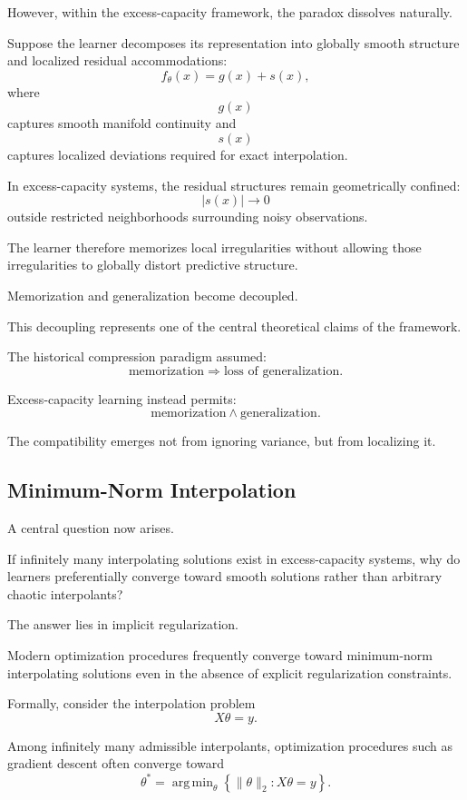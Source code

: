 \documentclass[12pt,a4paper]{article}
\DeclareMathOperator*{\argmin}{arg\,min}
\begin{document}
However, within the excess-capacity framework, the paradox dissolves naturally.

Suppose the learner decomposes its representation into globally smooth structure and localized residual accommodations:
\[
f_\theta(x)
=
g(x)
+
s(x),
\]
where
\[
g(x)
\]
captures smooth manifold continuity and
\[
s(x)
\]
captures localized deviations required for exact interpolation.

In excess-capacity systems, the residual structures remain geometrically confined:
\[
|s(x)| \to 0
\]
outside restricted neighborhoods surrounding noisy observations.

The learner therefore memorizes local irregularities without allowing those irregularities to globally distort predictive structure.

Memorization and generalization become decoupled.

This decoupling represents one of the central theoretical claims of the framework.

The historical compression paradigm assumed:
\[
\text{memorization}
\Rightarrow
\text{loss of generalization}.
\]

Excess-capacity learning instead permits:
\[
\text{memorization}
\land
\text{generalization}.
\]

The compatibility emerges not from ignoring variance, but from localizing it.

\subsection{Minimum-Norm Interpolation}

A central question now arises.

If infinitely many interpolating solutions exist in excess-capacity systems, why do learners preferentially converge toward smooth solutions rather than arbitrary chaotic interpolants?

The answer lies in implicit regularization.

Modern optimization procedures frequently converge toward minimum-norm interpolating solutions even in the absence of explicit regularization constraints.

Formally, consider the interpolation problem
\[
X\theta = y.
\]

Among infinitely many admissible interpolants, optimization procedures such as gradient descent often converge toward
\[
\theta^\ast
=
\argmin_\theta
\left\{
\|\theta\|_2
:
X\theta = y
\right\}.
\]
\end{document}
